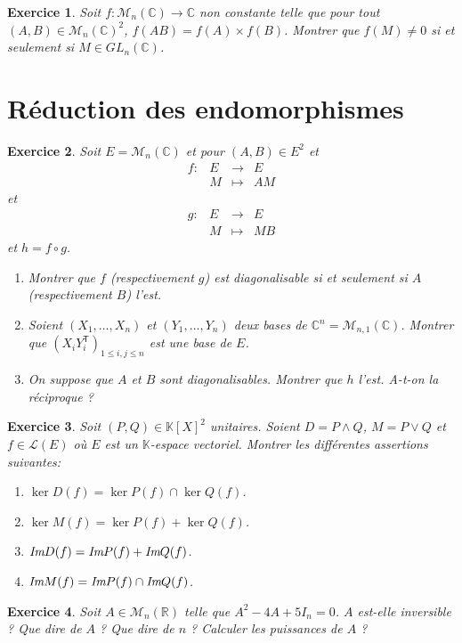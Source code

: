\documentclass[12pt]{article}
\newtheorem{exercise}{Exercice}[section]
\theoremstyle{remark}
\theoremstyle{remark}
\newcommand{\K}{\mathbb{K}} \newcommand{\R}{\mathbb{R}}
\newcommand{\C}{\mathbb{C}} \newcommand{\Q}{\mathbb{Q}}
\newcommand{\M}{\mathcal{M}} \renewcommand{\L}{\mathcal{L}}
\newcommand{\function}[5]{
	$$
	\begin{array}{rccl}
		#1: & #2 & \to & #3 \\
		& #4 & \mapsto & #5
	\end{array}
	$$
}
\begin{document}
\begin{exercise}
	Soit $f:\M_{n}(\C)\to\C$ non constante telle que pour tout $(A,B)\in\M_{n}(\C)^{2}$, $f(AB)=f(A)\times f(B)$. 
	Montrer que $f(M)\neq0$ si et seulement si $M\in GL_{n}(\C)$.
\end{exercise}

\cleardoublepage
\section{Réduction des endomorphismes}

\begin{exercise}
	Soit $E=\M_{n}(\C)$ et pour $(A,B)\in E^{2}$ et \function{f}{E}{E}{M}{AM} et \function{g}{E}{E}{M}{MB} et $h=f\circ g$.
	\begin{enumerate}
		\item Montrer que $f$ (respectivement $g$) est diagonalisable si et seulement si $A$ (respectivement $B$) l'est.
		\item Soient $(X_{1},\dots,X_{n})$ et $(Y_{1},\dots,Y_{n})$ deux bases de $\C^{n}=\M_{n,1}(\C)$. 
		Montrer que $(X_{i}Y_{i}^{\mathsf{T}})_{1\leqslant i,j\leqslant n}$ est une base de $E$.
		\item On suppose que $A$ et $B$ sont diagonalisables. Montrer que $h$ l'est. A-t-on la réciproque ?
	\end{enumerate}
\end{exercise}

\begin{exercise}
	Soit $(P,Q)\in\K[X]^{2}$ unitaires. Soient $D=P\wedge Q$, $M=P\vee Q$ et $f\in\L(E)$ où $E$ est un $\K$-espace vectoriel.
	Montrer les différentes assertions suivantes:
	\begin{enumerate}
		\item $\ker D(f)=\ker P(f)\cap \ker Q(f)$.
		\item $\ker M(f)=\ker P(f)+ \ker Q(f)$.
		\item $\emph{Im} D(f)=\emph{Im} P(f)+\emph{Im} Q(f)$.
		\item $\emph{Im} M(f)=\emph{Im} P(f)\cap\emph{Im} Q(f)$.
	\end{enumerate}
\end{exercise}

\begin{exercise}
	Soit $A\in\M_{n}(\R)$ telle que $A^{2}-4A+5I_{n}=0$. $A$ est-elle inversible ? Que dire de $A$ ? Que dire de $n$ ?
	Calculer les puissances de $A$ ? 
\end{exercise}
\end{document}

